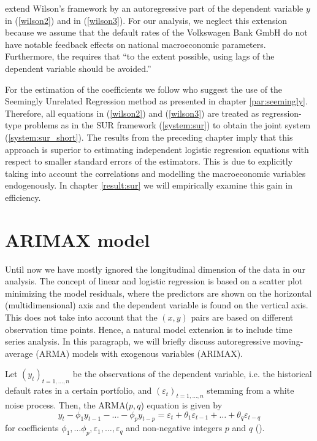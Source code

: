 \documentclass[a4paper, 12pt]{scrreprt}
\begin{document}
\textcite{wong2006framework} extend Wilson's framework by an autoregressive part of the dependent variable $y$ in (\ref{wilson2}) and in (\ref{wilson3}). For our analysis, we neglect this extension because we assume that the default rates of the Volkswagen Bank GmbH do not have notable feedback effects on national macroeconomic parameters. 
Furthermore, the \textcite[chapter 2.3.1.5.v]{ecb2018srep} requires that ``to the extent possible, using lags of the dependent variable should be avoided.''

For the estimation of the coefficients we follow \textcite{wong2006framework} who suggest the use of the Seemingly Unrelated Regression method as presented in chapter \ref{par:seemingly}. 
Therefore, all equations in (\ref{wilson2}) and (\ref{wilson3}) are treated as regression-type problems as in the SUR framework (\ref{system:sur}) to obtain the joint system (\ref{system:sur_short}). The results from the preceding chapter imply that this approach is superior to estimating independent logistic regression equations with respect to smaller standard errors of the estimators. This is due to explicitly taking into account the correlations and modelling the macroeconomic variables endogenously. In chapter \ref{result:sur} we will empirically examine this gain in efficiency.

\section{ARIMAX model}\label{par:arimax}

Until now we have mostly ignored the longitudinal dimension of the data in our analysis. The concept of linear and logistic regression is based on a scatter plot minimizing the model residuals, where the predictors are shown on the horizontal (multidimensional) axis and the dependent variable is found on the vertical axis.
This does not take into account that the $(x,y)$ pairs are based on different observation time points. Hence, a natural model extension is to include time series analysis.
In this paragraph, we will briefly discuss autoregressive moving-average (ARMA) models with exogenous variables (ARIMAX).

Let $(y_t)_{t=1,\ldots,n}$ be the observations of the dependent variable, i.e. the historical default rates in a certain portfolio, and $(\varepsilon_t)_{t=1,\ldots,n}$ stemming from a white noise process. Then, the ARMA($p,q$) equation is given by
\begin{equation}\label{arma}
y_t - \phi_1 y_{t-1} - \ldots - \phi_p y_{t-p} = \varepsilon_t + \theta_1 \varepsilon_{t-1} + \ldots + \theta_q \varepsilon_{t-q}
\end{equation}
for coefficients $\phi_1, \ldots \phi_p, \varepsilon_1, \ldots, \varepsilon_q$ and
non-negative integers $p$ and $q$ (\textcite[definition 7.1]{kreiss2006zeitreihenanalysis}).
\end{document}
